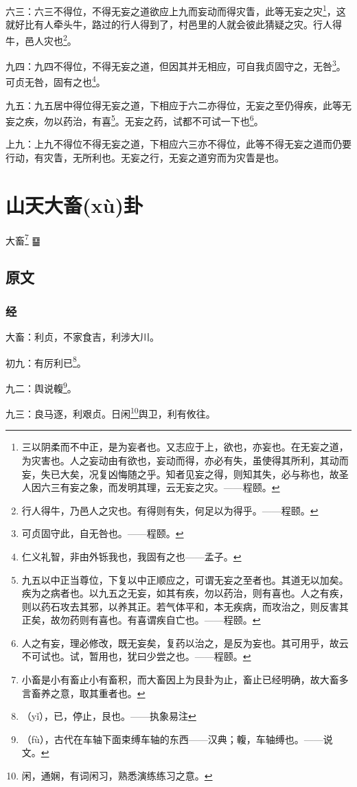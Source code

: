 \documentclass[12pt,oneside]{book}
\begin{document}
六三：六三不得位，不得无妄之道欲应上九而妄动而得灾眚，此等无妄之灾\footnote{三以阴柔而不中正，是为妄者也。又志应于上，欲也，亦妄也。在无妄之道，为灾害也。人之妄动由有欲也，妄动而得，亦必有失，虽使得其所利，其动而妄，失已大矣，况复凶悔随之乎。知者见妄之得，则知其失，必与称也，故圣人因六三有妄之象，而发明其理，云无妄之灾。——程颐。}，这就好比有人牵头牛，路过的行人得到了，村邑里的人就会彼此猜疑之灾。行人得牛，邑人灾也\footnote{行人得牛，乃邑人之灾也。有得则有失，何足以为得乎。——程颐。}。

九四：九四不得位，不得无妄之道，但因其并无相应，可自我贞固守之，无咎\footnote{可贞固守此，自无咎也。——程颐。}。可贞无咎，固有之也\footnote{仁义礼智，非由外铄我也，我固有之也——孟子。}。

九五：九五居中得位得无妄之道，下相应于六二亦得位，无妄之至仍得疾，此等无妄之疾，勿以药治，有喜\footnote{九五以中正当尊位，下复以中正顺应之，可谓无妄之至者也。其道无以加矣。疾为之病者也。以九五之无妄，如其有疾，勿以药治，则有喜也。人之有疾，则以药石攻去其邪，以养其正。若气体平和，本无疾病，而攻治之，则反害其正矣，故勿药则有喜也。有喜谓疾自亡也。——程颐。}。无妄之药，试都不可试一下也\footnote{人之有妄，理必修改，既无妄矣，复药以治之，是反为妄也。其可用乎，故云不可试也。试，暂用也，犹曰少尝之也。——程颐。}。

上九：上九不得位不得无妄之道，下相应六三亦不得位，此等不得无妄之道而仍要行动，有灾眚，无所利也。无妄之行，无妄之道穷而为灾眚是也。


\chapter{山天大畜(xù)卦}
大畜\footnote{小畜是小有畜止小有畜积，而大畜因上为艮卦为止，畜止已经明确，故大畜多言畜养之意，取其重者也。} {\Large ䷙}

\section{原文}

\subsection{经}
大畜：利贞，不家食吉，利涉大川。

初九：有厉利已\footnote{（yǐ），已，停止，艮也。——执象易注}。

九二：舆说輹\footnote{（fù），古代在车轴下面束缚车轴的东西——汉典；輹，车轴缚也。——说文。}。

九三：良马逐，利艰贞。日闲\footnote{闲，通娴，有词闲习，熟悉演练练习之意。}舆卫，利有攸往。
\end{document}
